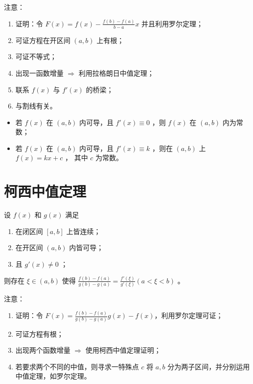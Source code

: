 注意：\begin{enumerate}
    \item 证明：令 $ F(x)=f(x)-\frac{f(b)-f(a)}{b-a}x $ 并且利用罗尔定理；
    \item 可证方程在开区间 $ (a,b) $ 上有根；
    \item 可证不等式；
    \item 出现一函数增量 $ \Rightarrow $ 利用拉格朗日中值定理；
    \item 联系 $ f(x) $ 与 $ f'(x) $ 的桥梁；
    \item 与割线有关。
\end{enumerate}

\begin{Infer}[拉格朗日中值定理推论]

    \begin{itemize}
        \item 若 $ f(x) $ 在 $ (a,b) $ 内可导，且 $ f'(x)\equiv0 $ ，则 $ f(x) $ 在 $ (a,b) $ 内为常数；
        \item 若 $ f(x) $ 在 $ (a,b) $ 内可导，且 $ f'(x)\equiv k $ ，则在 $ (a,b) $ 上 $ f(x)=kx+c $ ，
        其中 $ c $ 为常数。
    \end{itemize}
\end{Infer}

\section{柯西中值定理}

\begin{Theo}[柯西中值定理]

    设 $ f(x) $ 和 $ g(x) $ 满足
    \begin{enumerate}
        \item 在闭区间 $ [a,b] $ 上皆连续；
        \item 在开区间 $ (a,b) $ 内皆可导；
        \item 且 $ g'(x)\neq 0 $ ；
    \end{enumerate}
    则存在 $ \xi\in (a,b) $ 使得 $ \frac{f(b)-f(a)}{g(b)-g(a)}=\frac{f'(\xi)}{g'(\xi)}(a<\xi<b) $ 。
\end{Theo}

注意：\begin{enumerate}
    \item 证明：令 $ F(x)=\frac{f(b)-f(a)}{g(b)-g(a)}g(x)-f(x) $，利用罗尔定理可证；
    \item 可证方程有根；
    \item 出现两个函数增量 $ \Rightarrow $ 使用柯西中值定理证明；
    \item 若要求两个不同的中值，则寻求一特殊点 $ c $ 将 $ a,b $ 分为两子区间，并分别运用中值定理，如罗尔定理。
\end{enumerate}

